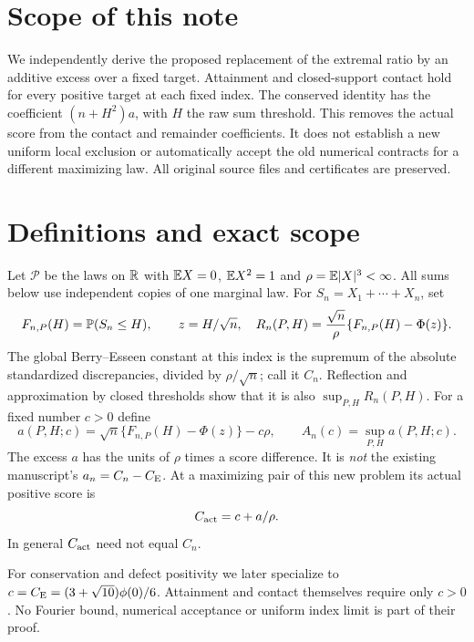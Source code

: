 \section*{Scope of this note}
We independently derive the proposed replacement of the extremal ratio by
an additive excess over a fixed target. Attainment and closed-support
contact hold for every positive target at each fixed index. The conserved
identity has the coefficient $(n+H^2)a$, with $H$ the raw sum threshold.
This removes the actual score from the contact and remainder coefficients.
It does not establish a new uniform local exclusion or automatically
accept the old numerical contracts for a different maximizing law. All original source
files and certificates are preserved.

\section{Definitions and exact scope}
Let $\mathcal P$ be the laws on $\mathbb R$ with $\mathbb E X=0$, $\mathbb E X^2=1$ and
$\rho=\mathbb E|X|^3<\infty$. All sums below use independent copies of one
marginal law. For $S_n=X_1+\cdots+X_n$, set
\[
 F_{n,P}(H)=\mathbb P(S_n\le H),\qquad z=H/\sqrt n,
 \quad R_n(P,H)=\frac{\sqrt n}{\rho}\{F_{n,P}(H)-\Phi(z)\}.
\]
The global Berry--Esseen constant at this index is the supremum of the
absolute standardized discrepancies, divided by $\rho/\sqrt n$; call it
$C_n$. Reflection and approximation by closed thresholds show that it is
also $\sup_{P,H}R_n(P,H)$. For a fixed number $c>0$ define
\[
 a(P,H;c)=\sqrt n\{F_{n,P}(H)-\Phi(z)\}-c\rho,
 \qquad A_n(c)=\sup_{P,H}a(P,H;c).
\]
The excess $a$ has the units of $\rho$ times a score difference. It is
\emph{not} the existing manuscript's $a_n=C_n-C_{\mathrm E}$. At a maximizing pair
of this new problem its actual positive score is
\begin{equation}\label{v4excess:eq:actual}
 C_{\rm act}=c+a/\rho.
\end{equation}
In general $C_{\rm act}$ need not equal $C_n$.

For conservation and defect positivity we later specialize to
$c=C_{\mathrm E}=(3+\sqrt{10})\phi(0)/6$. Attainment and contact themselves require
only $c>0$. No Fourier bound, numerical acceptance or uniform index limit
is part of their proof.

